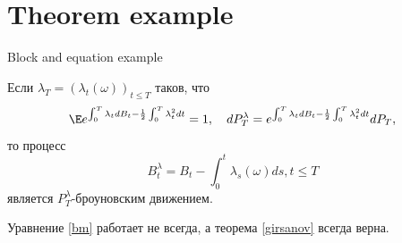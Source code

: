 \documentclass[aspectratio=169]{beamer}
\begin{document}
    \section{Theorem example}
    \begin{frame}{Block  and equation example}
        \begin{theorem}[И. Гирсанов]\label{girsanov}
			Если $\lambda_T = (\lambda_t (\omega))_{t \leq T}$ таков, что 
			\begin{equation}
             \E e^{\int_0^T \lambda_t dB_t - \frac{1}{2}\int_0^T \lambda_t^2 dt} = 1, \quad dP_T^\lambda = e^{\int_0^T \lambda_t dB_t - \frac{1}{2}\int_0^T \lambda_t^2 dt} dP_T,
			\end{equation}
			то процесс 
			\begin{equation}\label{bm}
				B^\lambda_t = B_t - \int_0^t \lambda_s(\omega) ds, t \leq T
			\end{equation}
			 является $P_T^\lambda$-броуновским движением.
		\end{theorem}
        Уравнение \eqref{bm} работает не всегда, а теорема \ref{girsanov} всегда верна.
    \end{frame}
\end{document}
